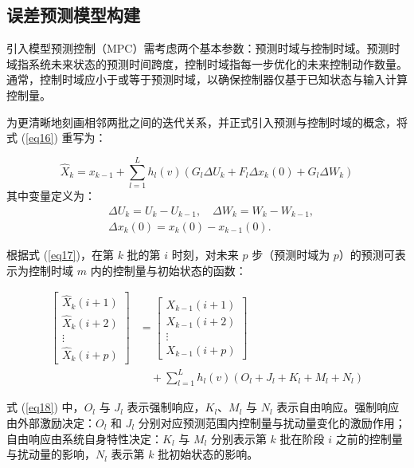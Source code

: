 \subsection{误差预测模型构建}
\label{3-2}

引入模型预测控制（MPC）需考虑两个基本参数：预测时域与控制时域。预测时域指系统未来状态的预测时间跨度，控制时域指每一步优化的未来控制动作数量。通常，控制时域应小于或等于预测时域，以确保控制器仅基于已知状态与输入计算控制量。

为更清晰地刻画相邻两批之间的迭代关系，并正式引入预测与控制时域的概念，将式 (\ref{eq16}) 重写为：

\begin{equation}
\hat{X}_k=x_{k-1}+\sum_{l=1}^{L} h_l(v) \left( G_l \Delta U_k + F_l \Delta x_k(0) + G_l \Delta W_k \right)
\label{eq17}
\end{equation}
其中变量定义为：
\begin{equation*}
\begin{aligned}
& \Delta U_k = U_k - U_{k-1}, \quad
\Delta W_k = W_k - W_{k-1}, \\
& \Delta x_k(0) = x_k(0) - x_{k-1}(0).
\end{aligned}
\end{equation*}

根据式 (\ref{eq17})，在第 $k$ 批的第 $i$ 时刻，对未来 $p$ 步（预测时域为 $p$）的预测可表示为控制时域 $m$ 内的控制量与初始状态的函数：

\begin{equation}
\begin{aligned}
\left[\begin{array}{l}
\hat{X}_k(i+1) \\
\hat{X}_k(i+2) \\
\vdots \\
\hat{X}_k(i+p)
\end{array}\right]
&= \left[\begin{array}{l}
X_{k-1}(i+1) \\
X_{k-1}(i+2) \\
\vdots \\
X_{k-1}(i+p)
\end{array}\right] \\
&\quad + \sum_{l=1}^{L} h_l(v)\left(O_l + J_l + K_l + M_l + N_l\right)
\end{aligned}
\label{eq18}
\end{equation}

式 (\ref{eq18}) 中，$O_l$ 与 $J_l$ 表示强制响应，$K_l$、$M_l$ 与 $N_l$ 表示自由响应。强制响应由外部激励决定：$O_l$ 和 $J_l$ 分别对应预测范围内控制量与扰动量变化的激励作用；自由响应由系统自身特性决定：$K_l$ 与 $M_l$ 分别表示第 $k$ 批在阶段 $i$ 之前的控制量与扰动量的影响，$N_l$ 表示第 $k$ 批初始状态的影响。


